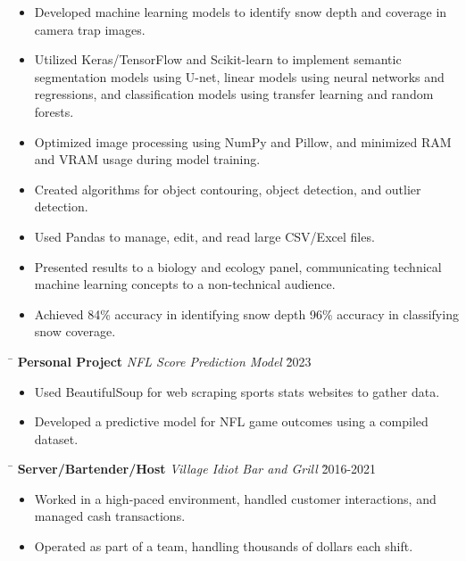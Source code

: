 \documentclass[a4paper,11pt]{article}
\def\locationh{\hspace{7cm}}
\def\subsectionv{\vspace{-5.3ex}}
\def\postpointsv{\vspace{0cm}}
\def\betweenjobsv{\vspace{0.4cm}}
\begin{document}
\begin{itemize}[leftmargin=.5cm, itemsep=.1cm, before=\subsectionv, after=\postpointsv]
    \item Developed machine learning models to identify snow depth and coverage in camera trap images.
    \item Utilized Keras/TensorFlow and Scikit-learn to implement semantic segmentation models using U-net, linear models using neural networks and regressions, and classification models using transfer learning and random forests.
    \item Optimized image processing using NumPy and Pillow, and minimized RAM and VRAM usage during model training.
    \item Created algorithms for object contouring, object detection, and outlier detection. 
    \item Used Pandas to manage, edit, and read large CSV/Excel files.
    \item Presented results to a biology and ecology panel, communicating technical machine learning concepts to a non-technical audience.
    \item Achieved 84\% accuracy in identifying snow depth 96\% accuracy in classifying snow coverage.
\end{itemize}

\betweenjobsv

\begin{tabbing}
    \locationh \= \kill
    \textbf{Personal Project} \> \textit{NFL Score Prediction Model} \` 2023 \\
\end{tabbing}

\begin{itemize}[leftmargin=.5cm, itemsep=.1cm, before=\subsectionv, after=\postpointsv]
    \item Used BeautifulSoup for web scraping sports stats websites to gather data.
    \item Developed a predictive model for NFL game outcomes using a compiled dataset.
\end{itemize}

\betweenjobsv

\begin{tabbing}
    \locationh \= \kill
    \textbf{Server/Bartender/Host} \> \textit{Village Idiot Bar and Grill} \` 2016-2021 \\
\end{tabbing}

\begin{itemize}[leftmargin=.5cm, itemsep=.1cm, before=\subsectionv, after=\postpointsv]
    \item Worked in a high-paced environment, handled customer interactions, and managed cash transactions.
    \item Operated as part of a team, handling thousands of dollars each shift.
\end{itemize}
\end{document}
